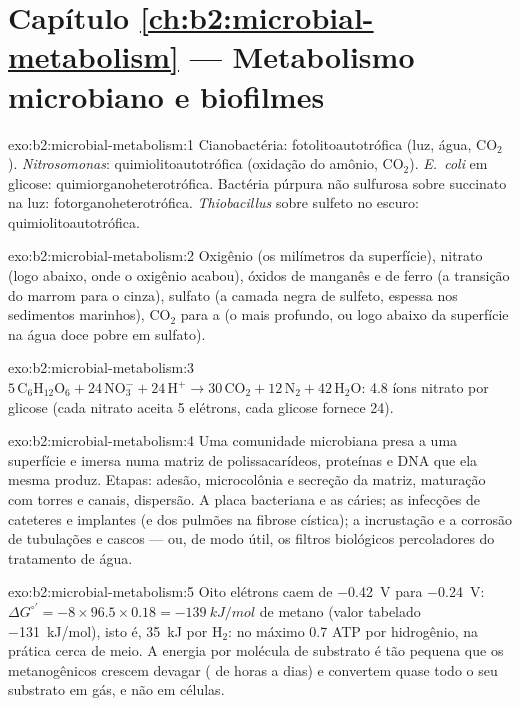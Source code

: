 \section*{Capítulo \ref{ch:b2:microbial-metabolism} --- Metabolismo microbiano e biofilmes}

\begin{solution}{exo:b2:microbial-metabolism:1}
Cianobactéria: fotolitoautotrófica (luz, água, $\mathrm{CO_2}$).
\emph{Nitrosomonas}: quimiolitoautotrófica (oxidação do amônio,
$\mathrm{CO_2}$). \emph{E.~coli} em glicose: quimiorganoheterotrófica.
Bactéria púrpura não sulfurosa sobre succinato na luz:
fotorganoheterotrófica. \emph{Thiobacillus} sobre sulfeto no escuro:
quimiolitoautotrófica.
\end{solution}

\begin{solution}{exo:b2:microbial-metabolism:2}
Oxigênio (os milímetros da superfície), nitrato (logo abaixo, onde o
oxigênio acabou), óxidos de manganês e de ferro (a transição do marrom
para o cinza), sulfato (a camada negra de sulfeto, espessa nos
sedimentos marinhos), $\mathrm{CO_2}$ para a  (o mais
profundo, ou logo abaixo da superfície na água doce pobre em sulfato).
\end{solution}

\begin{solution}{exo:b2:microbial-metabolism:3}
$5\,\mathrm{C_6H_{12}O_6} + 24\,\mathrm{NO_3^-} + 24\,\mathrm{H^+}
\to 30\,\mathrm{CO_2} + 12\,\mathrm{N_2} + 42\,\mathrm{H_2O}$: 4.8
íons nitrato por glicose (cada nitrato aceita 5 elétrons, cada glicose
fornece 24).
\end{solution}

\begin{solution}{exo:b2:microbial-metabolism:4}
Uma comunidade microbiana presa a uma superfície e imersa numa matriz
de polissacarídeos, proteínas e DNA que ela mesma produz. Etapas:
adesão, microcolônia e secreção da matriz, maturação com torres e
canais, dispersão. A placa bacteriana e as cáries; as infecções de
cateteres e implantes (e dos pulmões na fibrose cística); a
incrustação e a corrosão de tubulações e cascos --- ou, de modo útil,
os filtros biológicos percoladores do tratamento de água.
\end{solution}

\begin{solution}{exo:b2:microbial-metabolism:5}
Oito elétrons caem de \qty{-0.42}{V} para \qty{-0.24}{V}:
$\Delta G^{\circ\prime} = -8\times 96.5\times 0.18 =
\qty{-139}{kJ/mol}$ de metano (valor tabelado \qty{-131}{kJ/mol}), isto
é, \qty{35}{kJ} por $\mathrm{H_2}$: no máximo 0.7 ATP por hidrogênio,
na prática cerca de meio. A energia por molécula de substrato é tão
pequena que os metanogênicos crescem devagar ( de
horas a dias) e convertem quase todo o seu substrato em gás, e não em
células.
\end{solution}

